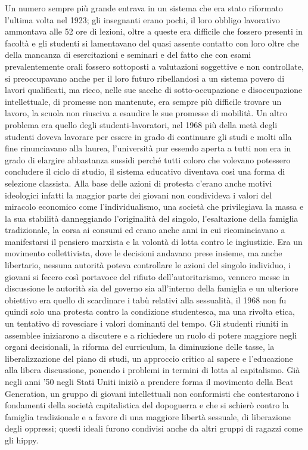 Un numero sempre più grande entrava in un sistema che era stato riformato l'ultima volta nel 1923; gli insegnanti erano pochi, il loro obbligo lavorativo ammontava alle 52 ore di lezioni, oltre a queste era difficile che fossero presenti in facoltà e gli studenti si lamentavano del quasi assente contatto con loro oltre che della mancanza di esercitazioni e seminari e del fatto che con esami prevalentemente orali fossero sottoposti a valutazioni soggettive e non controllate, si preoccupavano anche per il loro futuro ribellandosi a un sistema povero di lavori qualificati, ma ricco, nelle sue sacche di sotto-occupazione e disoccupazione intellettuale, di promesse non mantenute, era sempre più difficile trovare un lavoro, la scuola non riusciva a esaudire le sue promesse di mobilità.
Un altro problema era quello degli studenti-lavoratori, nel 1968 più della metà degli studenti doveva lavorare per essere in grado di continuare gli studi e molti alla fine rinunciavano alla laurea, l'università pur essendo aperta a tutti non era in grado di elargire abbastanza sussidi perché tutti coloro che volevano potessero concludere il ciclo di studio, il sistema educativo diventava così una forma di selezione classista.
Alla base delle azioni di protesta c'erano anche motivi ideologici infatti la maggior parte dei giovani non condivideva i valori del miracolo economico come l'individualismo, una società che privilegiava la massa e la sua stabilità danneggiando l'originalità del singolo, l'esaltazione della famiglia tradizionale, la corsa ai consumi ed erano anche anni in cui ricominciavano a manifestarsi il pensiero marxista e la volontà di lotta contro le ingiustizie.
Era un movimento collettivista, dove le decisioni andavano prese insieme, ma anche libertario, nessuna autorità poteva controllare le azioni del singolo individuo, i giovani si fecero così portavoce del rifiuto dell'autoritarismo, vennero messe in discussione le autorità sia del governo sia all'interno della famiglia e un ulteriore obiettivo era quello di scardinare i tabù relativi alla sessualità, il 1968 non fu quindi solo una protesta contro la condizione studentesca, ma una rivolta etica, un tentativo di rovesciare i valori dominanti del tempo.
Gli studenti riuniti in assemblee iniziarono a discutere e a richiedere un ruolo di potere maggiore negli organi decisionali, la riforma del curriculum, la diminuzione delle tasse, la liberalizzazione del piano di studi, un approccio critico al sapere e l’educazione alla libera discussione, ponendo i problemi in termini di lotta al capitalismo.
Già negli anni '50 negli Stati Uniti iniziò a prendere forma il movimento della Beat Generation, un gruppo di giovani intellettuali non conformisti che contestarono i fondamenti della società capitalistica del dopoguerra e che si schierò contro la famiglia tradizionale e a favore di una maggiore libertà sessuale, di liberazione degli oppressi; questi ideali furono condivisi anche da altri gruppi di ragazzi come gli hippy.

